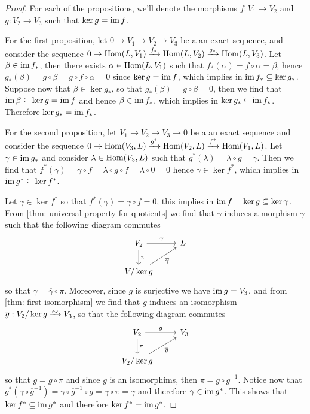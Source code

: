 \begin{proof}
  For each of the propositions, we'll denote the morphisms \(f: V_1 \to V_2\)
  and  \(g: V_2 \to V_3\) such that \(\ker g = \operatorname{im} f\).

  For the first proposition, let \(0 \to V_1 \to V_2 \to V_3\) be a an exact
  sequence, and consider the sequence \(0 \to \operatorname{Hom}(L, V_1) \xrightarrow{f_*}
  \operatorname{Hom}(L, V_2) \xrightarrow{g_*} \operatorname{Hom}(L, V_3)\). Let \(\beta \in \operatorname{im} f_*\), then
  there exists \(\alpha \in \operatorname{Hom}(L, V_1)\) such that \(f_*(\alpha) = f \circ
  \alpha = \beta\), hence \(g_*(\beta) = g \circ \beta = g \circ f \circ \alpha
  = 0\) since \(\ker g = \operatorname{im} f\), which implies in \(\operatorname{im} f_* \subseteq \ker
  g_*\).  Suppose now that \(\beta \in \ker g_*\), so that \(g_*(\beta) = g
  \circ \beta = 0\), then we find that \(\operatorname{im} \beta \subseteq \ker g = \operatorname{im} f\)
  and hence \(\beta \in \operatorname{im} f_*\), which implies in \(\ker g_* \subseteq \operatorname{im}
  f_*\).  Therefore \(\ker g_* = \operatorname{im} f_*\).

  For the second proposition, let \(V_1 \to V_2 \to V_3 \to 0\) be a an exact
  sequence and consider the sequence \(0 \to \operatorname{Hom}(V_3, L) \xrightarrow{g^*}
  \operatorname{Hom}(V_2, L) \xrightarrow{f^*} \operatorname{Hom}(V_1, L)\). Let \(\gamma \in \operatorname{im} g_*\) and
  consider \(\lambda \in \operatorname{Hom}(V_3, L)\) such that \(g^*(\lambda) = \lambda \circ
  g = \gamma\). Then we find that \(f^*(\gamma) = \gamma \circ f = \lambda \circ
  g \circ f = \lambda \circ 0 = 0\) hence \(\gamma \in \ker f^*\), which implies
  in \(\operatorname{im} g^* \subseteq \ker f^*\).

  Let \(\gamma \in \ker f^*\) so that \(f^*(\gamma) = \gamma \circ f = 0\), this
  implies in \(\operatorname{im} f = \ker g \subseteq \ker \gamma\). From \cref{thm: universal
  property for quotients} we find that \(\gamma\) induces a morphism
  \(\overline\gamma\) such that the following diagram commutes
  \[
    \begin{tikzcd}
      V_2 \ar[r, "\gamma"] \ar[d, "\pi"] &L \\
      V/\ker g \ar[ur, swap, "\overline\gamma"]
    \end{tikzcd}
  \]
  so that \(\gamma = \overline\gamma \circ \pi\). Moreover, since \(g\) is
  surjective we have \(\operatorname{im} g = V_3\), and from \cref{thm: first isomorphism} we
  find that \(g\) induces an isomorphism \(\overline g: V_2/\ker g \isoto
  V_3\), so that the following diagram commutes
  \[
    \begin{tikzcd}
      V_2 \ar[r, "g"] \ar[d, "\pi"] &V_3 \\
      V_2/\ker g \ar[ru, swap, "\overline g"]
    \end{tikzcd}
  \]
  so that \(g = \overline g \circ \pi\) and since \(\overline g\) is an
  isomorphims, then \(\pi = g \circ \overline g^{-1}\). Notice now that
  \(g^*(\overline \gamma \circ \overline g^{-1}) = \overline\gamma \circ
  \overline g^{-1} \circ g = \overline\gamma \circ \pi = \gamma\) and therefore
  \(\gamma \in \operatorname{im} g^*\). This shows that \(\ker f^* \subseteq \operatorname{im} g^*\) and
  therefore \(\ker f^* = \operatorname{im} g^*\).
\end{proof}
